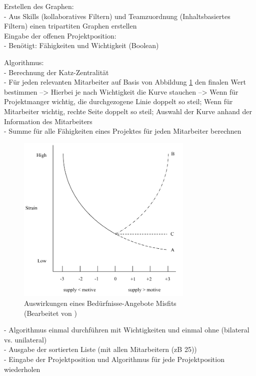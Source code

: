 Erstellen des Graphen:\\
- Aus Skills (kollaboratives Filtern) und Teamzuordnung (Inhaltsbasiertes Filtern) einen tripartiten Graphen erstellen\\

Eingabe der offenen Projektposition:\\
- Benötigt: Fähigkeiten und Wichtigkeit (Boolean)

Algorithmus:\\
- Berechnung der Katz-Zentralität\\
- Für jeden relevanten Mitarbeiter auf Basis von Abbildung \ref{fig:methodik:abb2} den finalen Wert bestimmen --> Hierbei je nach Wichtigkeit die Kurve stauchen --> Wenn für Projektmanger wichtig, die durchgezogene Linie doppelt so steil; Wenn für Mitarbeiter wichtig, rechte Seite doppelt so steil; Auswahl der Kurve anhand der Information des Mitarbeiters\\
- Summe für alle Fähigkeiten eines Projektes für jeden Mitarbeiter berechnen

\begin{figure}[h]
	\centering
	\includegraphics[width=0.75\textwidth]{gfx/ueberschuss_supply_motive.png}
	\caption{Auswirkungen eines Bedürfnisse-Angebote Misfits \cite[S. 23]{edwards:2008}\\(Bearbeitet von \myName)}
	\label{fig:methodik:abb2}
\end{figure}

- Algorithmus einmal durchführen mit Wichtigkeiten und einmal ohne (bilateral vs. unilateral)\\
- Ausgabe der sortierten Liste (mit allen Mitarbeitern (zB 25))\\
- Eingabe der Projektposition und Algorithmus für jede Projektposition wiederholen

